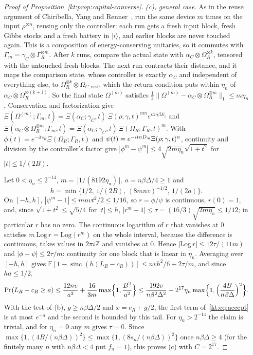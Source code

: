 \begin{proof}[Proof of Proposition~\ref{kt:prop:capital-converse}]
\emph{(c), general case.} As in the reuse argument of Chiribella, Yang and Renner~\cite{ChiribellaYangRenner21}, run the same device $m$ times on the input $\rho^{\otimes n}$, reusing only the controller: each run gets a fresh input block, fresh Gibbs stocks and a fresh battery in $|i\rangle$, and earlier blocks are never touched again. This is a composition of energy-conserving unitaries, so it commutes with $\Gamma_m=\gamma_C\otimes\Gamma_R^{\otimes m}$. After $k$ runs, compare the actual state with $\alpha_C\otimes\Omega_R^{\otimes k}$, tensored with the untouched fresh blocks. The next run contracts their distance, and it maps the comparison state, whose controller is exactly $\alpha_C$ and independent of everything else, to $\Omega_R^{\otimes k}\otimes\Omega_{C,\mathrm{rest}}$, which the return condition puts within $\eta_n$ of $\alpha_C\otimes\Omega_R^{\otimes(k+1)}$. So the final state $\Omega^{(m)}$ satisfies $\tfrac12\|\Omega^{(m)}-\alpha_C\otimes\Omega_R^{\otimes m}\|_1\le m\eta_n$. Conservation and factorization give $\Xi(\Omega^{(m)};\Gamma_m,t)=\Xi(\alpha_C;\gamma_C,t)\,\Xi(\rho;\gamma,t)^{nm}e^{itm\beta E_i}$ and $\Xi(\alpha_C\otimes\Omega_R^{\otimes m};\Gamma_m,t)=\Xi(\alpha_C;\gamma_C,t)\,\Xi(\Omega_R;\Gamma_R,t)^m$. With $\phi(t)=e^{-itc_R}\Xi(\Omega_R;\Gamma_R,t)$ and $\psi(t)=e^{-itnD_{\rm in}}\Xi(\rho;\gamma,t)^n$, continuity and division by the controller's factor give $|\phi^m-\psi^m|\le4\sqrt{2m\eta_n}\sqrt{1+t^2}$ for $|t|\le1/(2B)$.

Let $0<\eta_n\le2^{-14}$, $m=\lfloor1/(8192\eta_n)\rfloor$, $a=n\beta\Delta/4\ge1$ and
\[
h=\min\{1/2,\,1/(2B),\,(8mnv)^{-1/2},\,1/(2a)\}.
\]
On $[-h,h]$, $|\psi^m-1|\le mnvt^2/2\le1/16$, so $r=\phi/\psi$ is continuous, $r(0)=1$, and, since $\sqrt{1+t^2}\le\sqrt{5/4}$ for $|t|\le h$, $|r^m-1|\le\tau=(16/3)\sqrt{2m\eta_n}\le1/12$; in particular $r$ has no zero. The continuous logarithm of $r$ that vanishes at $0$ satisfies $m\,\mathrm{Log}\,r=\mathrm{Log}(r^m)$ on the whole interval, because the difference is continuous, takes values in $2\pi i\mathbb Z$ and vanishes at $0$. Hence $|\mathrm{Log}\,r|\le12\tau/(11m)$ and $|\phi-\psi|\le2\tau/m$: continuity for one block that is linear in $\eta_n$. Averaging over $[-h,h]$ gives $\mathbb E[1-\operatorname{sinc}(h(L_R-c_R))]\le nvh^2/6+2\tau/m$, and since $ha\le1/2$,
\[
\Pr(L_R-c_R\ge a)\le\frac{12nv}{a^2}+\frac{16}{3m}\max\Bigl\{1,\frac{B^2}{a^2}\Bigr\}\le\frac{192v}{n\beta^2\Delta^2}+2^{17}\eta_n\max\Bigl\{1,\Bigl(\frac{4B}{n\beta\Delta}\Bigr)^2\Bigr\}.
\]
With the test of (b), $g\ge n\beta\Delta/2$ and $x=c_R+g/2$, the first term of~\eqref{kt:eq:accept} is at most $e^{-a}$ and the second is bounded by this tail. For $\eta_n>2^{-14}$ the claim is trivial, and for $\eta_n=0$ any $m$ gives $\tau=0$. Since $\max\{1,(4B/(n\beta\Delta))^2\}\le\max\{1,(8s_n/(n\beta\Delta))^2\}$ once $n\beta\Delta\ge4$ (for the finitely many $n$ with $n\beta\Delta<4$ put $f_n=1$), this proves (c) with $C=2^{17}$.


\end{proof}
